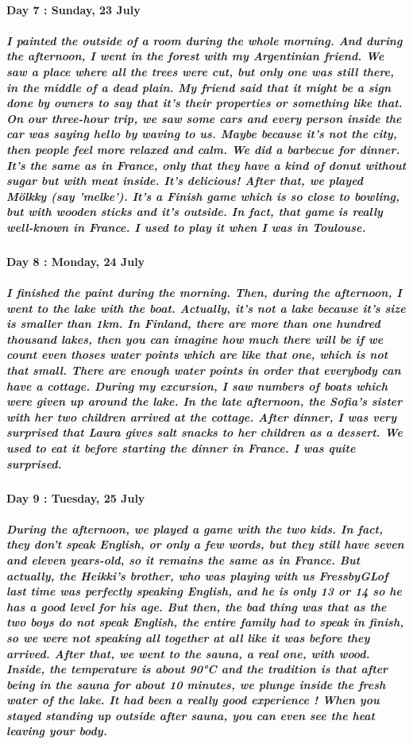 \documentclass[a4paper,12pt]{report} %
\begin{document}
\paragraph{Day 7 : Sunday, 23 July}
\subparagraph{I painted the outside of a room during the whole morning. And during the afternoon, I went in the forest with my Argentinian friend. We saw a place where all the trees were cut, but only one was still there, in the middle of a dead plain. My friend said that it might be a sign done by owners to say that it's their properties or something like that. On our three-hour trip, we saw some cars and every person inside the car was saying hello by waving to us. Maybe because it's not the city, then people feel more relaxed and calm. We did a barbecue for dinner. It's the same as in France, only that they have a kind of donut without sugar but with meat inside. It's delicious! After that, we played Mölkky (say 'melke'). It's a Finish game which is so close to bowling, but with wooden sticks and it's outside. In fact, that game is really well-known in France. I used to play it when I was in Toulouse.}

\paragraph{Day 8 : Monday, 24 July}
\subparagraph{I finished the paint during the morning. Then, during the afternoon, I went to the lake with the boat. Actually, it's not a lake because it's size is smaller than 1km. In Finland, there are more than one hundred thousand lakes, then you can imagine how much there will be if we count even thoses water points which are like that one, which is not that small. There are enough water points in order that everybody can have a cottage. During my excursion, I saw numbers of boats which were given up around the lake. In the late afternoon, the Sofia's sister with her two children arrived at the cottage. After dinner, I was very surprised that Laura gives salt snacks to her children as a dessert. We used to eat it before starting the dinner in France. I was quite surprised.}

\paragraph{Day 9 : Tuesday, 25 July}
\subparagraph{During the afternoon, we played a game with the two kids. In fact, they don't speak English, or only a few words, but they still have seven and eleven years-old, so it remains the same as in France. But actually, the Heikki's brother, who was playing with us FressbyGLof last time was perfectly speaking English, and he is only 13 or 14 so he has a good level for his age. But then, the bad thing was that as the two boys do not speak English, the entire family had to speak in finish, so we were not speaking all together at all like it was before they arrived. After that, we went to the sauna, a real one, with wood. Inside, the temperature is about 90°C and the tradition is that after being in the sauna for about 10 minutes, we plunge inside the fresh water of the lake. It had been a really good experience ! When you stayed standing up outside after sauna, you can even see the heat leaving your body.}
\end{document}
